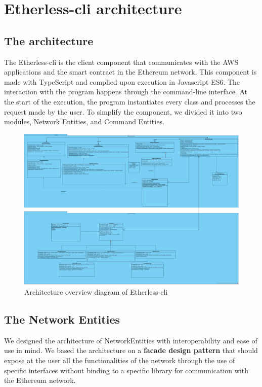 \section{Etherless-cli architecture}
\subsection{The architecture}
The Etherless-cli is the client component that communicates with the AWS applications and the smart contract in the Ethereum network.
This component is made with TypeScript and complied upon execution in Javascript ES6.
The interaction with the program happens through the command-line interface.
At the start of the execution, the program instantiates every class and processes the request made by the user.
To simplify the component, we divided it into two modules, Network Entities, and Command Entities.

\begin{figure}[h]
	\centering
	\includegraphics[width=\textwidth]{./res/img/Etherless-cli.png}
	\caption{Architecture overview diagram of Etherless-cli}
\end{figure}

\subsection{The Network Entities}
We designed the architecture of NetworkEntities with interoperability and ease of use in mind.
We based the architecture on a \textbf{facade design pattern} that should expose at the user all the functionalities
of the network through the use of specific interfaces without binding to a specific library for communication
with the Ethereum network.
